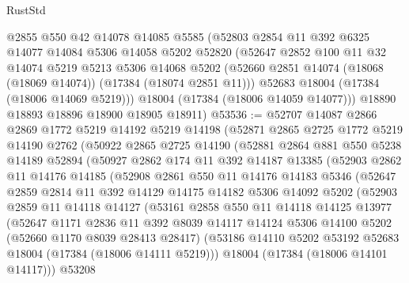 \begin{lexlean}{RustStd}
\begin{coremodule}
      @2855
      @550
      @42
      @14078
      @14085
      @5585
      (@52803
        @2854
        @11
        @392
        @6325
        @14077
        @14084
        @5306
        @14058
        @5202
        @52820
        (@52647
          @2852
          @100
          @11
          @32
          @14074
          @5219
          @5213
          @5306
          @14068
          @5202
          (@52660 @2851 @14074 (@18068 (@18069 @14074)) (@17384 (@18074 @2851 @11)))
          @52683
          @18004
          (@17384 (@18006 @14069 @5219)))
        @18004
        (@17384 (@18006 @14059 @14077)))
      @18890
      @18893
      @18896
      @18900
      @18905
      @18911)
@53536 := @52707
    @14087
    @2866
    @2869
    @1772
    @5219
    @14192
    @5219
    @14198
    (@52871
      @2865
      @2725
      @1772
      @5219
      @14190
      @2762
      (@50922
        @2865
        @2725
        @14190
        (@52881
          @2864
          @881
          @550
          @5238
          @14189
          @52894
          (@50927
            @2862
            @174
            @11
            @392
            @14187
            @13385
            (@52903
              @2862
              @11
              @14176
              @14185
              (@52908
                @2861
                @550
                @11
                @14176
                @14183
                @5346
                (@52647
                  @2859
                  @2814
                  @11
                  @392
                  @14129
                  @14175
                  @14182
                  @5306
                  @14092
                  @5202
                  (@52903
                    @2859
                    @11
                    @14118
                    @14127
                    (@53161
                      @2858
                      @550
                      @11
                      @14118
                      @14125
                      @13977
                      (@52647
                        @1171
                        @2836
                        @11
                        @392
                        @8039
                        @14117
                        @14124
                        @5306
                        @14100
                        @5202
                        (@52660 @1170 @8039 @28413 @28417)
                        (@53186 @14110 @5202 @53192 @52683 @18004 (@17384 (@18006 @14111 @5219)))
                        @18004
                        (@17384 (@18006 @14101 @14117)))
                      @53208

\end{coremodule}
\end{lexlean}
